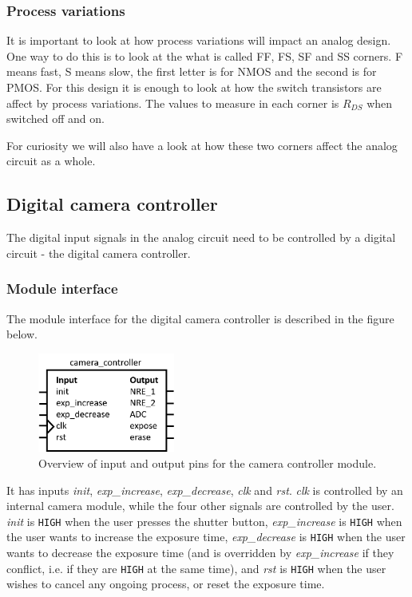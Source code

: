 \subsubsection{Process variations}

It is important to look at how process variations will impact an analog design. One way to do this is to look at the what is called FF, FS, SF and SS corners. F means fast, S means slow, the first letter is for NMOS and the second is for PMOS. For this design it is enough to look at how the switch transistors are affect by process variations. The values to measure in each corner is $R_{DS}$ when switched off and on.

For curiosity we will also have a look at how these two corners affect the analog circuit as a whole.

\subsection{Digital camera controller}
The digital input signals in the analog circuit need to be controlled by a digital circuit - the digital camera controller.

\subsubsection{Module interface}

The module interface for the digital camera controller is described in the figure below.

\begin{figure}[H]
    \centering
    \includegraphics[width=0.4\textwidth]{graphs/camera_controller_pinout.png}
    \caption{Overview of input and output pins for the camera controller module.}
    \label{fig:io}
\end{figure}

It has inputs \emph{init}, \emph{exp\_increase}, \emph{exp\_decrease}, \emph{clk} and \emph{rst}. \emph{clk} is controlled by an internal camera module, while the four other signals are controlled by the user. \emph{init} is \verb|HIGH| when the user presses the shutter button, \emph{exp\_increase} is \verb|HIGH| when the user wants to increase the exposure time, \emph{exp\_decrease} is \verb|HIGH| when the user wants to decrease the exposure time (and is overridden by \emph{exp\_increase} if they conflict, i.e. if they are \verb|HIGH| at the same time), and \emph{rst} is \verb|HIGH| when the user wishes to cancel any ongoing process, or reset the exposure time.

